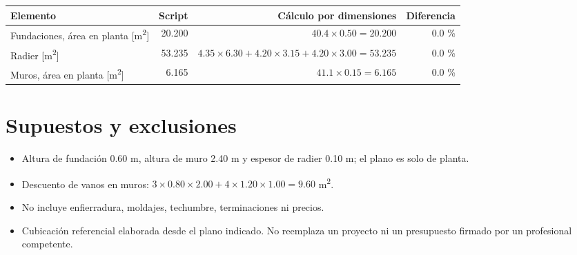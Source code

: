 \documentclass[10pt,a4paper]{article}
\begin{document}
\medskip
\begin{tabular*}{\textwidth}{@{\extracolsep{\fill}}lrrr@{}}\toprule
Elemento & Script & Cálculo por dimensiones & Diferencia\\\midrule
Fundaciones, área en planta [m\textsuperscript{2}] & 20.200 & $40.4 \times 0.50 = 20.200$ & 0.0 \%\\
Radier [m\textsuperscript{2}] & 53.235 & $4.35\times6.30 + 4.20\times3.15 + 4.20\times3.00 = 53.235$ & 0.0 \%\\
Muros, área en planta [m\textsuperscript{2}] & 6.165 & $41.1 \times 0.15 = 6.165$ & 0.0 \%\\\bottomrule
\end{tabular*}

\section{Supuestos y exclusiones}
\begin{itemize}
\item Altura de fundación 0.60 m, altura de muro 2.40 m y espesor de radier 0.10 m; el plano es solo de planta.
\item Descuento de vanos en muros: $3 \times 0.80 \times 2.00 + 4 \times 1.20 \times 1.00 = 9.60$ m\textsuperscript{2}.
\item No incluye enfierradura, moldajes, techumbre, terminaciones ni precios.
\item Cubicación referencial elaborada desde el plano indicado. No reemplaza un proyecto ni un presupuesto firmado por un profesional competente.
\end{itemize}
\end{document}
